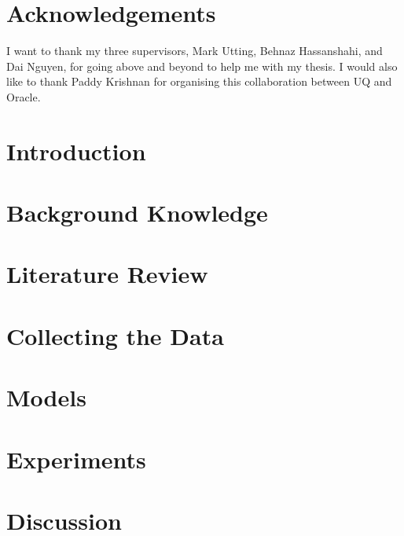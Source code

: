 \documentclass[12pt]{report}
\begin{document}
\chapter*{Acknowledgements}
I want to thank my three supervisors, Mark Utting, Behnaz Hassanshahi, and Dai Nguyen, for going above and beyond to help me with my thesis. I would also like to thank Paddy Krishnan for organising this collaboration between UQ and Oracle.

\noindent

\tableofcontents

\cleardoublepage{}
\chapter{Introduction}


\chapter{Background Knowledge}


\chapter{Literature Review}


\chapter{Collecting the Data}


\chapter{Models}


\chapter{Experiments}


%

\chapter{Discussion}

\end{document}
